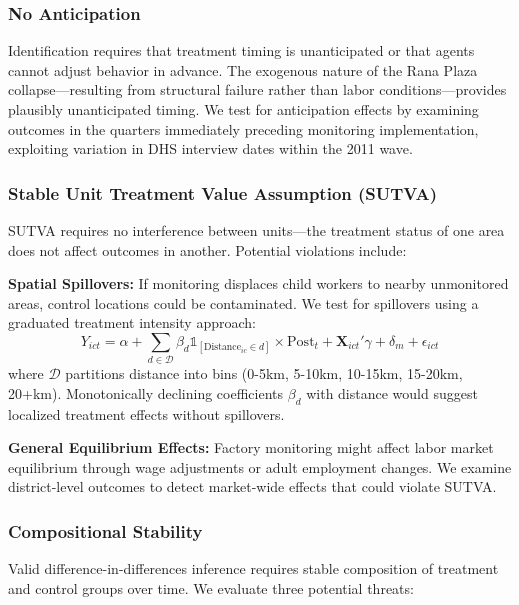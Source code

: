 \documentclass[12pt]{article}
\begin{document}
\subsubsection{No Anticipation}

Identification requires that treatment timing is unanticipated or that agents cannot adjust behavior in advance. The exogenous nature of the Rana Plaza collapse—resulting from structural failure rather than labor conditions—provides plausibly unanticipated timing. We test for anticipation effects by examining outcomes in the quarters immediately preceding monitoring implementation, exploiting variation in DHS interview dates within the 2011 wave.

\subsubsection{Stable Unit Treatment Value Assumption (SUTVA)}

SUTVA requires no interference between units—the treatment status of one area does not affect outcomes in another. Potential violations include:

\textbf{Spatial Spillovers:} If monitoring displaces child workers to nearby unmonitored areas, control locations could be contaminated. We test for spillovers using a graduated treatment intensity approach:
\begin{equation}
Y_{ict} = \alpha + \sum_{d \in \mathcal{D}} \beta_d \mathbb{1}_{[\text{Distance}_{ic} \in d]} \times \text{Post}_t + \mathbf{X}_{ict}'\gamma + \delta_m + \epsilon_{ict}
\end{equation}
where $\mathcal{D}$ partitions distance into bins (0-5km, 5-10km, 10-15km, 15-20km, 20+km). Monotonically declining coefficients $\beta_d$ with distance would suggest localized treatment effects without spillovers.

\textbf{General Equilibrium Effects:} Factory monitoring might affect labor market equilibrium through wage adjustments or adult employment changes. We examine district-level outcomes to detect market-wide effects that could violate SUTVA.

\subsubsection{Compositional Stability}

Valid difference-in-differences inference requires stable composition of treatment and control groups over time. We evaluate three potential threats:
\end{document}
